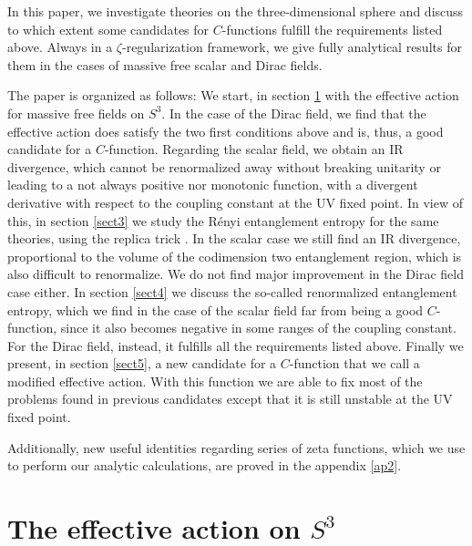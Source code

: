 \documentclass[12pt,a4paper]{article}
\numberwithin{equation}{section}
\begin{document}
In this paper, we investigate theories on the three-dimensional sphere and discuss to which extent some candidates for $\textit{C}$-functions fulfill the requirements listed above. Always in a $\zeta$-regularization framework, we give fully analytical results for them in the cases of massive free scalar and Dirac fields.
	
The paper is organized as follows: We start, in section \ref{sect2} with the effective action for massive free fields on $S^3$.
In the case of the Dirac field, we find that the effective action does satisfy the two first conditions above and is, thus, a good candidate for a $\textit{C}$-function. Regarding the scalar field, we obtain an IR divergence, which cannot be renormalized away without breaking unitarity or leading to a not always positive nor monotonic function, with a divergent derivative with respect to the coupling constant at the UV fixed point. In view of this, in section \ref{sect3} we study the R\'enyi entanglement entropy for the same theories, using the replica trick \cite{cardy}. In the scalar case we still find an IR divergence, proportional to the volume of the codimension two entanglement region, which is also difficult to renormalize. We do not find major improvement in the Dirac field case either. In section \ref{sect4} we discuss the so-called renormalized entanglement entropy, which we find in the case of the scalar field far from being a good $C$-function, since it also becomes negative in some ranges of the coupling constant. For the Dirac field, instead, it fulfills all the requirements listed above. Finally we present, in section \ref{sect5}, a new candidate for a $\textit{C}$-function that we call a modified effective action. With this function we are able to fix most of the problems found in previous candidates except that it is still unstable at the UV fixed point.

Additionally, new useful identities regarding series of zeta functions, which we use to perform our analytic calculations, are proved in the appendix \ref{ap2}.

\section{The effective action on $S^3$}\label{sect2}
\end{document}
